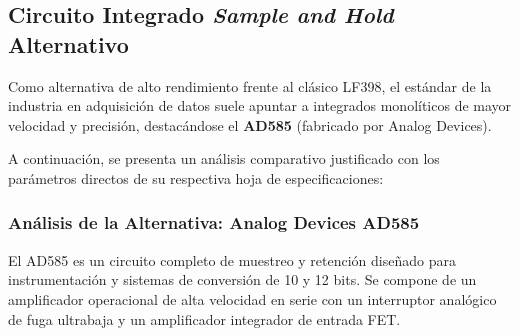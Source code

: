 \subsection{Circuito Integrado \textit{Sample and Hold} Alternativo}

Como alternativa de alto rendimiento frente al clásico LF398, el estándar de la industria en adquisición de datos suele apuntar a integrados monolíticos de mayor velocidad y precisión, destacándose el \textbf{AD585} (fabricado por Analog Devices). 

A continuación, se presenta un análisis comparativo justificado con los parámetros directos de su respectiva hoja de especificaciones:

\subsubsection*{Análisis de la Alternativa: Analog Devices AD585}

El AD585 es un circuito completo de muestreo y retención diseñado para instrumentación y sistemas de conversión de 10 y 12 bits. Se compone de un amplificador operacional de alta velocidad en serie con un interruptor analógico de fuga ultrabaja y un amplificador integrador de entrada FET.

